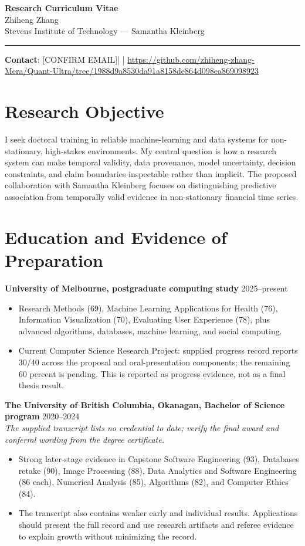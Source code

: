 \documentclass[11pt]{article}
\newcommand{\ApplicantName}{Zhiheng Zhang}
\newcommand{\ApplicantEmail}{[CONFIRM EMAIL]}
\newcommand{\ApplicantPhone}{[CONFIRM PHONE]}
\newcommand{\ApplicantGitHub}{\url{https://github.com/zhiheng-zhang-Mera/Quant-Ultra/tree/1988d9a8530da91a8158de864d098ea869098923}}
\begin{document}
\begin{center}
{\LARGE\bfseries Research Curriculum Vitae}\\[0.25em]
{\large \ApplicantName}\\
Stevens Institute of Technology --- Samantha Kleinberg
\end{center}
\vspace{0.35em}\hrule\vspace{0.65em}

\textbf{Contact}: \ApplicantEmail\quad | \quad \ApplicantPhone\quad | \quad \ApplicantGitHub

\section*{Research Objective}
I seek doctoral training in reliable machine-learning and data systems for non-stationary, high-stakes environments. My central question is how a research system can make temporal validity, data provenance, model uncertainty, decision constraints, and claim boundaries inspectable rather than implicit. The proposed collaboration with Samantha Kleinberg focuses on distinguishing predictive association from temporally valid evidence in non-stationary financial time series.

\section*{Education and Evidence of Preparation}
\textbf{University of Melbourne, postgraduate computing study} \hfill 2025--present
\begin{itemize}
\item Research Methods (69), Machine Learning Applications for Health (76), Information Visualization (70), Evaluating User Experience (78), plus advanced algorithms, databases, machine learning, and social computing.
\item Current Computer Science Research Project: supplied progress record reports 30/40 across the proposal and oral-presentation components; the remaining 60 percent is pending. This is reported as progress evidence, not as a final thesis result.
\end{itemize}

\textbf{The University of British Columbia, Okanagan, Bachelor of Science program} \hfill 2020--2024\\
\textit{The supplied transcript lists no credential to date; verify the final award and conferral wording from the degree certificate.}
\begin{itemize}
\item Strong later-stage evidence in Capstone Software Engineering (93), Databases retake (90), Image Processing (88), Data Analytics and Software Engineering (86 each), Numerical Analysis (85), Algorithms (82), and Computer Ethics (84).
\item The transcript also contains weaker early and individual results. Applications should present the full record and use research artifacts and referee evidence to explain growth without minimizing the record.
\end{itemize}
\end{document}
